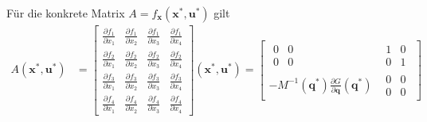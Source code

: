 \documentclass[a4paper, 12pt]{scrartcl}
\begin{document}
Für die konkrete Matrix $A = f_{\bm{x}}(\bm{x}^*, \bm{u}^*)$ gilt
\begin{align*}
    A(\bm{x}^*, \bm{u}^*)
    &=
    \begin{bmatrix}
        \frac{\partial f_1}{\partial x_1}  
        & \frac{\partial f_1}{\partial x_2}  
        & \frac{\partial f_1}{\partial x_3}  
        & \frac{\partial f_1}{\partial x_4} 
        \\ \frac{\partial f_2}{\partial x_1} 
        & \frac{\partial f_2}{\partial x_2} 
        & \frac{\partial f_2}{\partial x_3} 
        & \frac{\partial f_2}{\partial x_4} 
        \\ \frac{\partial f_3}{\partial x_1} 
        & \frac{\partial f_3}{\partial x_2} 
        & \frac{\partial f_3}{\partial x_3} 
        & \frac{\partial f_3}{\partial x_4} 
        \\ \frac{\partial f_4}{\partial x_1} 
        & \frac{\partial f_4}{\partial x_2} 
        & \frac{\partial f_4}{\partial x_3} 
        & \frac{\partial f_4}{\partial x_4}
    \end{bmatrix}(\bm{x}^*, \bm{u}^*) 
    =  
    \begin{bmatrix}
        \begin{matrix}
            0 & 0 \\
            0 & 0
        \end{matrix}
        &
        \begin{matrix}
            1 & 0 \\
            0 & 1
        \end{matrix}
        \\[12pt]
        - M^{-1}(\bm{q}^*) \frac{\partial G}{\partial \bm{q}}(\bm{q}^*)
        &
        \begin{matrix}
            0 & 0 \\
            0 & 0
        \end{matrix}
    \end{bmatrix}
\end{align*}
\end{document}
